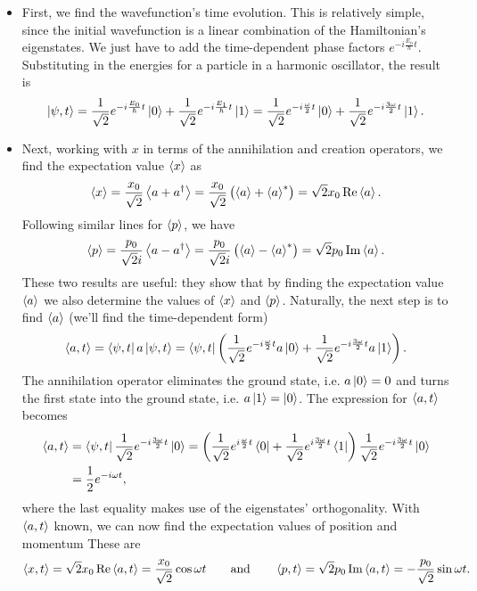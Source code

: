 \documentclass[11pt, a4paper]{article}
\newcommand{\eqtext}[1]{\qquad \text{#1} \qquad}
\begin{document}
\begin{itemize}
	\item First, we find the wavefunction's time evolution. This is relatively simple, since the initial wavefunction is a linear combination of the Hamiltonian's eigenstates. We just have to add the time-dependent phase factors $ e^{-i\frac{E_{n}}{\hbar}t} $. Substituting in the energies for a particle in a harmonic oscillator, the result is
	\begin{equation*}
		\ket{\psi, t} = \frac{1}{\sqrt{2}} e^{-i\frac{E_{0}}{\hbar}t}\ket{0} + \frac{1}{\sqrt{2}} e^{-i\frac{E_{1}}{\hbar}t}\ket{1}  =  \frac{1}{\sqrt{2}} e^{-i\frac{\omega}{2}t}\ket{0} + \frac{1}{\sqrt{2}} e^{-i\frac{3\omega}{2}t}\ket{1}.
	\end{equation*}
	
	\item Next, working with $ x $ in terms of the annihilation and creation operators, we find the expectation value $ \ev{x} $ as
	\begin{equation*}
		\ev{x} = \frac{x_{0}}{\sqrt{2}}\ev{a + a^{\dagger}} = \frac{x_{0}}{\sqrt{2}}\left(\ev{a} + \ev{a}^{*}\right) =  \sqrt{2}x_{0} \Re \ev{a}.
	\end{equation*}
	Following similar lines for $ \ev{p} $, we have
	\begin{equation*}
		\ev{p} = \frac{p_{0}}{\sqrt{2}i}\ev{a - a^{\dagger}} = \frac{p_{0}}{\sqrt{2}i}\left(\ev{a} - \ev{a}^{*}\right) = \sqrt{2}p_{0}\Im \ev{a}.
	\end{equation*}
	These two results are useful: they show that by finding the expectation value $ \ev{a} $ we also determine the values of $ \ev{x} $ and $ \ev{p} $. Naturally, the next step is to find $ \ev{a} $ (we'll find the time-dependent form)
	\begin{equation*}
		\ev{a, t} = \bra{\psi, t}a\ket{\psi, t} = \bra{\psi, t}\left(\frac{1}{\sqrt{2}}e^{-i\frac{\omega}{2}t}a \ket{0} + \frac{1}{\sqrt{2}}e^{-i\frac{3\omega}{2}t}a \ket{1}\right).
	\end{equation*}
	The annihilation operator eliminates the ground state, i.e. $ a \ket{0} = 0 $ and turns the first state into the ground state, i.e. $ a \ket{1} = \ket{0} $. The expression for $ \ev{a, t} $ becomes
	\begin{align*}
		\ev{a, t} &= \bra{\psi, t}\frac{1}{\sqrt{2}}e^{-i\frac{3\omega}{2}t}\ket{0} = \left(\frac{1}{\sqrt{2}}e^{i\frac{\omega}{2}t}\bra{0} + \frac{1}{\sqrt{2}}e^{i\frac{3\omega}{2}t}\bra{1}\right) \frac{1}{\sqrt{2}}e^{-i\frac{3\omega}{2}t}\ket{0}\\
		&=\frac{1}{2}e^{-i\omega t},
	\end{align*}
	where the last equality makes use of the eigenstates' orthogonality. With $ \ev{a, t} $ known, we can now find the expectation values of position and momentum These are
	\begin{equation*}
		\ev{x, t} = \sqrt{2}x_{0}\Re\ev{a, t} = \frac{x_{0}}{\sqrt{2}}\cos \omega t \eqtext{and} \ev{p, t} = \sqrt{2}p_{0}\Im\ev{a, t} = - \frac{p_{0}}{\sqrt{2}}\sin \omega t.
	\end{equation*}
	

\end{itemize}
\end{document}
